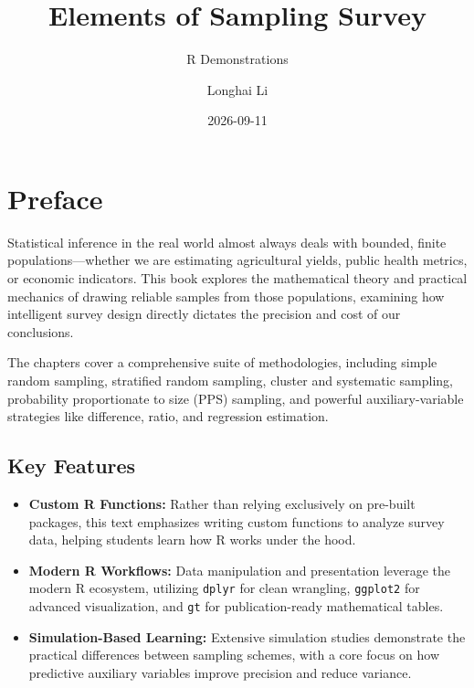 \documentclass[
  letterpaper,
  DIV=11,
  numbers=noendperiod]{scrreprt}
\title{Elements of Sampling Survey}
\subtitle{R Demonstrations}
\author{Longhai Li}
\date{2026-09-11}
\providecommand{\tightlist}{%
  \setlength{\itemsep}{0pt}\setlength{\parskip}{0pt}}
\renewcommand{\[}{\begin{equation}}
\renewcommand{\]}{\end{equation}}
\renewcommand*\contentsname{Table of contents}
\newcommand\contentsname{Table of contents}
\begin{document}
\maketitle

\renewcommand*\contentsname{Table of contents}
{
\setcounter{tocdepth}{2}
\tableofcontents
}


\chapter*{Preface}\label{preface}


Statistical inference in the real world almost always deals with
bounded, finite populations---whether we are estimating agricultural
yields, public health metrics, or economic indicators. This book
explores the mathematical theory and practical mechanics of drawing
reliable samples from those populations, examining how intelligent
survey design directly dictates the precision and cost of our
conclusions.

The chapters cover a comprehensive suite of methodologies, including
simple random sampling, stratified random sampling, cluster and
systematic sampling, probability proportionate to size (PPS) sampling,
and powerful auxiliary-variable strategies like difference, ratio, and
regression estimation.

\section*{Key Features}\label{key-features}


\begin{itemize}
\tightlist
\item
  \textbf{Custom R Functions:} Rather than relying exclusively on
  pre-built packages, this text emphasizes writing custom functions to
  analyze survey data, helping students learn how R works under the
  hood.
\item
  \textbf{Modern R Workflows:} Data manipulation and presentation
  leverage the modern R ecosystem, utilizing \texttt{dplyr} for clean
  wrangling, \texttt{ggplot2} for advanced visualization, and
  \texttt{gt} for publication-ready mathematical tables.
\item
  \textbf{Simulation-Based Learning:} Extensive simulation studies
  demonstrate the practical differences between sampling schemes, with a
  core focus on how predictive auxiliary variables improve precision and
  reduce variance.
\end{itemize}
\end{document}
